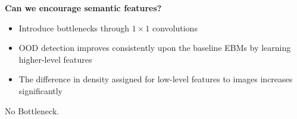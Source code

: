 \documentclass[landscape,a0paper,fontscale=0.292]{baposter}
\begin{document}
\begin{poster}
{\begin{minipage}[t]{.48\linewidth}
        \vspace{1em}

        \textbf{\color{blue}Can we encourage semantic features?}
        \begin{center}
        \resizebox{0.5\textwidth}{!}{
        
        }
        \end{center}
        \begin{itemize}
            \item Introduce bottlenecks through \(1 \times 1\) convolutions
            \item OOD detection improves consistently upon the baseline EBMs by learning higher-level features
            \item The difference in density assigned for low-level features to images increases significantly
        \end{itemize}
        \vspace{2mm}
        \begin{minipage}[b]{0.5\linewidth}
            \begin{center}
            No Bottleneck.
            \end{center}
        \end{minipage}%
        \hfill
        \begin{minipage}[b]{0.5\linewidth}
            \begin{center}
            \resizebox{\textwidth}{!}{
}
\end{center}
\end{minipage}
\end{minipage}}
\end{poster}
\end{document}
